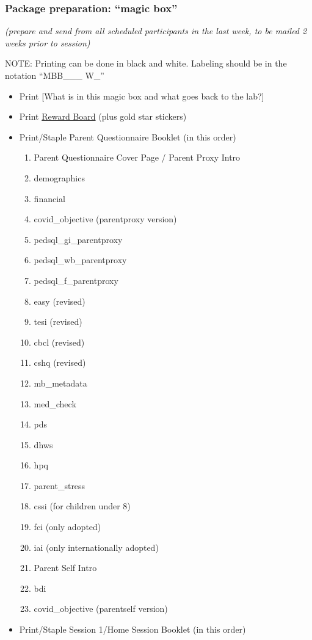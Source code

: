 \documentclass[]{book}
\providecommand{\tightlist}{%
  \setlength{\itemsep}{0pt}\setlength{\parskip}{0pt}}
\begin{document}
\hypertarget{package-preparation-magic-box}{%
\subsubsection{Package preparation: ``magic box''}\label{package-preparation-magic-box}}

\emph{(prepare and send from all scheduled participants in the last week, to be mailed 2 weeks prior to session)}

NOTE: Printing can be done in black and white. Labeling should be in the notation ``MBB\_\_\_ W\_''

\begin{itemize}
\tightlist
\item
  Print {[}What is in this magic box and what goes back to the lab?{]}
\item
  Print \href{https://ucla.app.box.com/file/668504120930}{Reward Board} (plus gold star stickers)
\item
  Print/Staple Parent Questionnaire Booklet (in this order)

  \begin{enumerate}
  \def\labelenumi{\arabic{enumi}.}
  \tightlist
  \item
    Parent Questionnaire Cover Page / Parent Proxy Intro
  \item
    demographics
  \item
    financial
  \item
    covid\_objective (parentproxy version)
  \item
    pedsql\_gi\_parentproxy
  \item
    pedsql\_wb\_parentproxy
  \item
    pedsql\_f\_parentproxy
  \item
    easy (revised)
  \item
    tesi (revised)
  \item
    cbcl (revised)
  \item
    cshq (revised)
  \item
    mb\_metadata
  \item
    med\_check
  \item
    pds
  \item
    dhws
  \item
    hpq
  \item
    parent\_stress
  \item
    cssi (for children under 8)
  \item
    fci (only adopted)
  \item
    iai (only internationally adopted)
  \item
    Parent Self Intro
  \item
    bdi
  \item
    covid\_objective (parentself version)
  \end{enumerate}
\item
  Print/Staple Session 1/Home Session Booklet (in this order)


\end{itemize}
\end{document}

